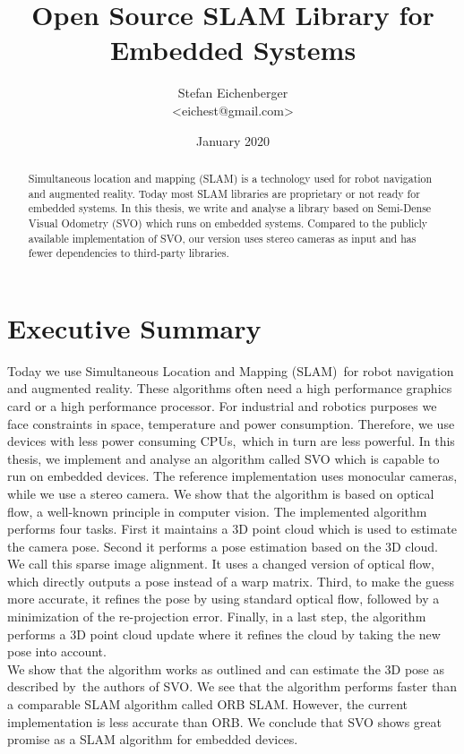 \documentclass[11pt,a4paper,titlepage,oneside]{report}
\title{Open Source SLAM Library for Embedded Systems}
\author{Stefan Eichenberger\\<eichest@gmail.com>}
\date{January 2020}
\begin{document}
\maketitle
\begin{abstract}
  Simultaneous location and mapping (SLAM) is a technology used for robot navigation and augmented reality. Today most SLAM libraries are proprietary or not ready for embedded systems. In this thesis, we write and analyse a library based on Semi-Dense Visual Odometry (SVO) which runs on embedded systems. Compared to the publicly available implementation of SVO, our version uses stereo cameras as input and has fewer dependencies to third-party libraries.
\end{abstract}

\section*{Executive Summary}
Today we use Simultaneous Location and Mapping (SLAM) for robot navigation and augmented reality. These algorithms often need a high performance graphics card or a high performance processor. For industrial and robotics purposes we face constraints in space, temperature and power consumption. Therefore, we use devices with less power consuming CPUs, which in turn are less powerful. In this thesis, we implement and analyse an algorithm called SVO which is capable to run on embedded devices. The reference implementation uses monocular cameras, while we use a stereo camera. We show that the algorithm is based on optical flow, a well-known principle in computer vision. The implemented algorithm performs four tasks. First it maintains a 3D point cloud which is used to estimate the camera pose. Second it performs a pose estimation based on the 3D cloud. We call this sparse image alignment. It uses a changed version of optical flow, which directly outputs a pose instead of a warp matrix. Third, to make the guess more accurate, it refines the pose by using standard optical flow, followed by a minimization of the re-projection error. Finally, in a last step, the algorithm performs a 3D point cloud update where it refines the cloud by taking the new pose into account.\\
We show that the algorithm works as outlined and can estimate the 3D pose as described by the authors of SVO. We see that the algorithm performs faster than a comparable SLAM algorithm called ORB SLAM. However, the current implementation is less accurate than ORB. We conclude that SVO shows great promise as a SLAM algorithm for embedded devices.
\end{document}

